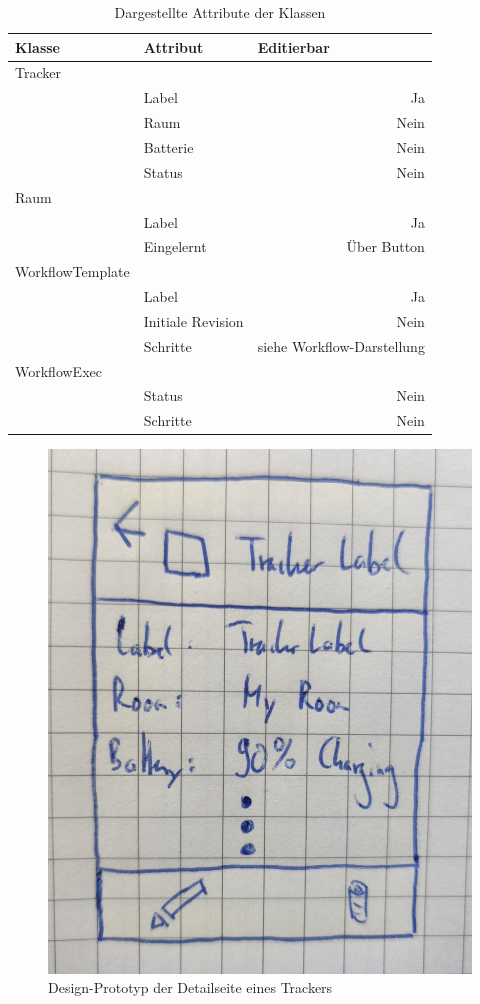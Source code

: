 \begin{table}[]
\centering
\begin{tabular}{l|l|r}
\textbf{Klasse}  & \textbf{Attribut} & \multicolumn{1}{l}{\textbf{Editierbar}} \\ \hline
Tracker          &                   &                                         \\
                 & Label             & Ja                                      \\
                 & Raum              & Nein                                    \\
                 & Batterie          & Nein                                    \\
                 & Status            & Nein                                    \\ \hline
Raum             &                   & \multicolumn{1}{l}{}                    \\
                 & Label             & Ja                                      \\
                 & Eingelernt        & Über Button                             \\ \hline
WorkflowTemplate &                   & \multicolumn{1}{l}{}                    \\
                 & Label             & Ja                                      \\
                 & Initiale Revision & Nein                                    \\
                 & Schritte          & siehe Workflow-Darstellung              \\ \hline
WorkflowExec     &                   & \multicolumn{1}{l}{}                    \\
                 & Status            & Nein                                    \\
                 & Schritte          & Nein
\end{tabular}
\caption{Dargestellte Attribute der Klassen}
\label{tab:detail-attributes}
\end{table}

\begin{figure}[h!tbp]
	\includegraphics[width=.5\textwidth]{images/ui-prototype/detail_page.jpg}
	\centering
	\caption{Design-Prototyp der Detailseite eines Trackers}
	\label{fig:ui-detail-page}
\end{figure}

